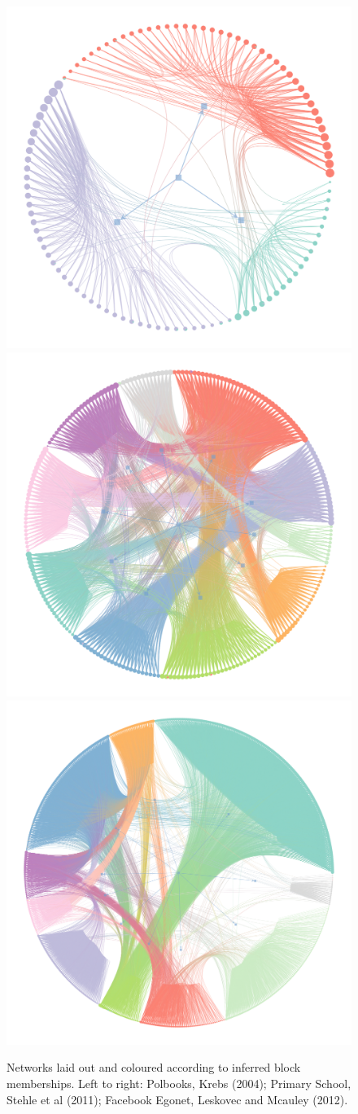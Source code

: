 \begin{table}[!ht]
	\centering
	\caption{Results averaged over $n=10$ iterations (mean $\pm$ std. dev.).}
	\label{tab:results}
\end{table}

\begin{figure}[!ht]
	\centering
	\includegraphics[width=0.28\linewidth]{img/polbooks-graph.png}
	\includegraphics[width=0.28\linewidth]{img/school-graph.png}
	\includegraphics[width=0.28\linewidth]{img/fb-graph.png}
	\caption{Networks laid out and coloured according to inferred block memberships. Left to right: Polbooks, Krebs (2004); Primary School, Stehle et al (2011); Facebook Egonet, Leskovec and Mcauley (2012).}
	\label{fig:graphs-all}
\end{figure}
